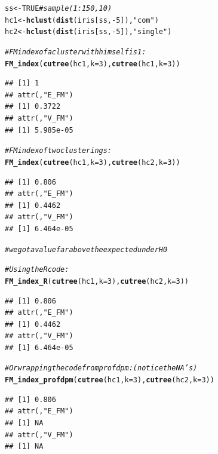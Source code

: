 \documentclass[shortnames,nojss,article]{jss}\usepackage[]{graphicx}\usepackage[]{color}
\makeatletter
\newcommand{\hlnum}[1]{\textcolor[rgb]{0.686,0.059,0.569}{#1}}%
\newcommand{\hlstr}[1]{\textcolor[rgb]{0.192,0.494,0.8}{#1}}%
\newcommand{\hlcom}[1]{\textcolor[rgb]{0.678,0.584,0.686}{\textit{#1}}}%
\newcommand{\hlopt}[1]{\textcolor[rgb]{0,0,0}{#1}}%
\newcommand{\hlstd}[1]{\textcolor[rgb]{0.345,0.345,0.345}{#1}}%
\newcommand{\hlkwb}[1]{\textcolor[rgb]{0.69,0.353,0.396}{#1}}%
\newcommand{\hlkwc}[1]{\textcolor[rgb]{0.333,0.667,0.333}{#1}}%
\newcommand{\hlkwd}[1]{\textcolor[rgb]{0.737,0.353,0.396}{\textbf{#1}}}%
\newenvironment{kframe}{%
 \def\at@end@of@kframe{}%
 \ifinner\ifhmode%
  \def\at@end@of@kframe{\end{minipage}}%
  \begin{minipage}{\columnwidth}%
 \fi\fi%
 \def\FrameCommand##1{\hskip\@totalleftmargin \hskip-\fboxsep
 \colorbox{shadecolor}{##1}\hskip-\fboxsep
     \hskip-\linewidth \hskip-\@totalleftmargin \hskip\columnwidth}%
 \MakeFramed {\advance\hsize-\width
   \@totalleftmargin\z@ \linewidth\hsize
   \@setminipage}}%
 {\par\unskip\endMakeFramed%
 \at@end@of@kframe}
\newenvironment{knitrout}{}{} %
\makeatother
\begin{document}
\begin{knitrout}
\color{fgcolor}\begin{kframe}
\begin{alltt}
\hlstd{ss} \hlkwb{<-} \hlnum{TRUE}  \hlcom{# sample(1:150, 10 )}
\hlstd{hc1} \hlkwb{<-} \hlkwd{hclust}\hlstd{(}\hlkwd{dist}\hlstd{(iris[ss,} \hlopt{-}\hlnum{5}\hlstd{]),} \hlstr{"com"}\hlstd{)}
\hlstd{hc2} \hlkwb{<-} \hlkwd{hclust}\hlstd{(}\hlkwd{dist}\hlstd{(iris[ss,} \hlopt{-}\hlnum{5}\hlstd{]),} \hlstr{"single"}\hlstd{)}

\hlcom{# FM index of a cluster with himself is 1:}
\hlkwd{FM_index}\hlstd{(}\hlkwd{cutree}\hlstd{(hc1,} \hlkwc{k} \hlstd{=} \hlnum{3}\hlstd{),} \hlkwd{cutree}\hlstd{(hc1,} \hlkwc{k} \hlstd{=} \hlnum{3}\hlstd{))}
\end{alltt}
\begin{verbatim}
## [1] 1
## attr(,"E_FM")
## [1] 0.3722
## attr(,"V_FM")
## [1] 5.985e-05
\end{verbatim}
\begin{alltt}
\hlcom{# FM index of two clusterings:}
\hlkwd{FM_index}\hlstd{(}\hlkwd{cutree}\hlstd{(hc1,} \hlkwc{k} \hlstd{=} \hlnum{3}\hlstd{),} \hlkwd{cutree}\hlstd{(hc2,} \hlkwc{k} \hlstd{=} \hlnum{3}\hlstd{))}
\end{alltt}
\begin{verbatim}
## [1] 0.806
## attr(,"E_FM")
## [1] 0.4462
## attr(,"V_FM")
## [1] 6.464e-05
\end{verbatim}
\begin{alltt}
\hlcom{# we got a value far above the expected under H0}

\hlcom{# Using the R code:}
\hlkwd{FM_index_R}\hlstd{(}\hlkwd{cutree}\hlstd{(hc1,} \hlkwc{k} \hlstd{=} \hlnum{3}\hlstd{),} \hlkwd{cutree}\hlstd{(hc2,} \hlkwc{k} \hlstd{=} \hlnum{3}\hlstd{))}
\end{alltt}
\begin{verbatim}
## [1] 0.806
## attr(,"E_FM")
## [1] 0.4462
## attr(,"V_FM")
## [1] 6.464e-05
\end{verbatim}
\begin{alltt}
\hlcom{# Or wrapping the code from profdpm: (notice the NA's)}
\hlkwd{FM_index_profdpm}\hlstd{(}\hlkwd{cutree}\hlstd{(hc1,} \hlkwc{k} \hlstd{=} \hlnum{3}\hlstd{),} \hlkwd{cutree}\hlstd{(hc2,} \hlkwc{k} \hlstd{=} \hlnum{3}\hlstd{))}
\end{alltt}
\begin{verbatim}
## [1] 0.806
## attr(,"E_FM")
## [1] NA
## attr(,"V_FM")
## [1] NA
\end{verbatim}
\begin{alltt}


\end{alltt}
\end{kframe}
\end{knitrout}
\end{document}
